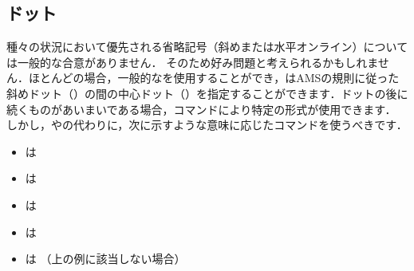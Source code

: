 \subsection{ドット}\label{dots}

種々の状況において優先される省略記号（斜めまたは水平オンライン）については一般的な合意がありません．
そのため好み問題と考えられるかもしれません．ほとんどの場合，一般的なを使用することができ，はAMSの規則に従った斜めドット（）の間の中心ドット（）を指定することができます．ドットの後に続くものがあいまいである場合，コマンドにより特定の形式が使用できます．
しかし，やの代わりに，次に示すような意味に応じたコマンドを使うべきです．
\begin{itemize}
\setlength{\itemsep}{0pt}
\item {} は 
\item {} は 
\item {}  は  
\item {}  は  
\item {} は   （上の例に該当しない場合）
\end{itemize}
